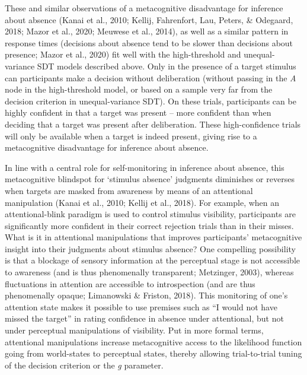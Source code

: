 \documentclass[12pt,twoside]{reedthesis}
\begin{document}
These and similar observations of a metacognitive disadvantage for inference about absence (Kanai et al., 2010; Kellij, Fahrenfort, Lau, Peters, \& Odegaard, 2018; Mazor et al., 2020; Meuwese et al., 2014), as well as a similar pattern in response times (decisions about absence tend to be slower than decisions about presence; Mazor et al., 2020) fit well with the high-threshold and unequal-variance SDT models described above. Only in the presence of a target stimulus can participants make a decision without deliberation (without passing in the \emph{A} node in the high-threshold model, or based on a sample very far from the decision criterion in unequal-variance SDT). On these trials, participants can be highly confident in that a target was present -- more confident than when deciding that a target was present after deliberation. These high-confidence trials will only be available when a target is indeed present, giving rise to a metacognitive disadvantage for inference about absence.

In line with a central role for self-monitoring in inference about absence, this metacognitive blindspot for `stimulus absence' judgments diminishes or reverses when targets are masked from awareness by means of an attentional manipulation (Kanai et al., 2010; Kellij et al., 2018). For example, when an attentional-blink paradigm is used to control stimulus visibility, participants are significantly more confident in their correct rejection trials than in their misses. What is it in attentional manipulations that improves participants' metacognitive insight into their judgments about stimulus absence? One compelling possibility is that a blockage of sensory information at the perceptual stage is not accessible to awareness (and is thus phenomenally transparent; Metzinger, 2003), whereas fluctuations in attention are accessible to introspection (and are thus phenomenally opaque; Limanowski \& Friston, 2018). This monitoring of one's attention state makes it possible to use premises such as ``I would not have missed the target'' in rating confidence in absence under attentional, but not under perceptual manipulations of visibility. Put in more formal terms, attentional manipulations increase metacognitive access to the likelihood function going from world-states to perceptual states, thereby allowing trial-to-trial tuning of the decision criterion or the \emph{g} parameter.
\end{document}
